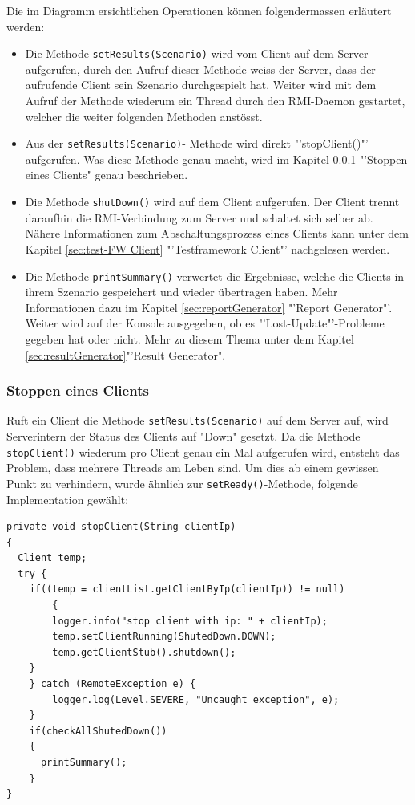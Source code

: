 Die im Diagramm ersichtlichen Operationen können folgender\-massen er\-läu\-tert werden:
\begin{itemize}
\item Die Methode \texttt{setResults(Scenario)} wird vom Client auf dem Server auf\-ge\-rufen, durch den Aufruf dieser Methode weiss der Server, dass der aufrufende Client sein Szenario durchgespielt hat. Weiter wird mit dem Aufruf der Methode wiederum ein Thread durch den RMI-Daemon gestartet, welcher die weiter folgenden Methoden anstösst.
\item Aus der \texttt{setResults(Scenario)}- Me\-tho\-de wird di\-rekt "'stopClient()"' auf\-ge\-rufen. Was diese Me\-tho\-de genau macht, wird im Kapitel \ref{sec:stopClient} "'Stop\-pen eines Clients" genau be\-schrie\-ben.
\item Die Methode \texttt{shutDown()} wird auf dem Client aufgerufen. Der Client trennt daraufhin die RMI-Verbindung zum Server und schaltet sich selber ab. Nähere Informationen zum Abschaltungsprozess eines Clients kann unter dem Kapitel \ref{sec:test-FW Client} "'Testframework Client"' nachgelesen werden.
\item Die Methode \texttt{printSummary()} verwertet die Ergebnisse, welche die Clients in ihrem Szenario gespeichert und wieder übertragen haben. Mehr Informationen dazu im Kapitel \ref{sec:reportGenerator} "'Report Generator"'. Weiter wird auf der Konsole ausgegeben, ob es "'Lost-Update"'-Probleme gegeben hat oder nicht. Mehr zu diesem Thema unter dem Kapitel \ref{sec:resultGenerator}"'Result Generator".
\end{itemize}

\subsubsection{Stoppen eines Clients}
\label{sec:stopClient}
Ruft ein Client die Methode \texttt{setResults(Scenario)} auf dem Server auf, wird Serverintern der Status des Clients auf "Down" gesetzt. Da die Methode \texttt{stopClient()} wiederum pro Client genau ein Mal aufgerufen wird, entsteht das Problem, dass mehrere Threads am Leben sind. Um dies ab einem gewissen Punkt zu verhindern, wurde ähnlich zur \texttt{setReady()}-Methode, folgende Implementation gewählt:
\begin{verbatim}
private void stopClient(String clientIp)
{
  Client temp;
  try {
	if((temp = clientList.getClientByIp(clientIp)) != null)
        {
	  	logger.info("stop client with ip: " + clientIp);
	  	temp.setClientRunning(ShutedDown.DOWN);
	  	temp.getClientStub().shutdown();
	}
	} catch (RemoteException e) {
	    logger.log(Level.SEVERE, "Uncaught exception", e);
	}
	if(checkAllShutedDown())
	{
	  printSummary();
	}
}
\end{verbatim}

